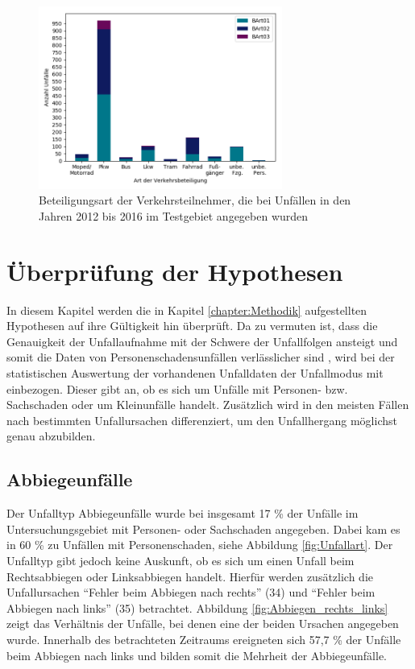 \begin{savenotes}
	\begin{figure}[H]
		\centering
		\includegraphics[width=8cm,height=6cm]{figures/BArt}
		\caption[Beteiligungsart der Verkehrsteilnehmer, die bei Unfällen in den Jahren 2012 bis 2016 im Testgebiet angegeben wurden]{Beteiligungsart der Verkehrsteilnehmer, die bei Unfällen in den Jahren 2012 bis 2016 im Testgebiet angegeben wurden}\label{fig:Beteiligungsart}
	\end{figure}
\end{savenotes}

\section{Überprüfung der Hypothesen}\label{sechtion:Überprüfung der Thesen}
In diesem Kapitel werden die in Kapitel \ref{chapter:Methodik} aufgestellten Hypothesen auf ihre Gültigkeit hin überprüft. Da zu vermuten ist, dass die Genauigkeit der Unfallaufnahme mit der Schwere der Unfallfolgen ansteigt und somit die Daten von Personenschadensunfällen verlässlicher sind \parencite[S. 11]{StatistischesBundesamt.2018b}, wird bei der statistischen Auswertung der vorhandenen Unfalldaten der Unfallmodus mit einbezogen. Dieser gibt an, ob es sich um Unfälle mit Personen- bzw. Sachschaden oder um Kleinunfälle handelt. Zusätzlich wird in den meisten Fällen nach bestimmten Unfallursachen differenziert, um den Unfallhergang möglichst genau abzubilden. %

\subsection{Abbiegeunfälle}\label{subsechtion:Abbiegeunfälle}
Der Unfalltyp Abbiegeunfälle wurde bei insgesamt 17 \% der Unfälle im Untersuchungsgebiet mit Personen- oder Sachschaden angegeben. Dabei kam es in 60 \% zu Unfällen mit Personenschaden, siehe Abbildung \ref{fig:Unfallart}. Der Unfalltyp gibt jedoch keine Auskunft, ob es sich um einen Unfall beim Rechtsabbiegen oder Linksabbiegen handelt. Hierfür werden zusätzlich die Unfallursachen \enquote{Fehler beim Abbiegen nach rechts} (34) und \enquote{Fehler beim Abbiegen nach links} (35) betrachtet. Abbildung \ref{fig:Abbiegen_rechts_links} zeigt das Verhältnis der Unfälle, bei denen eine der beiden Ursachen angegeben wurde. Innerhalb des betrachteten Zeitraums ereigneten sich 57,7 \% der Unfälle beim Abbiegen nach links und bilden somit die Mehrheit der Abbiegeunfälle.

